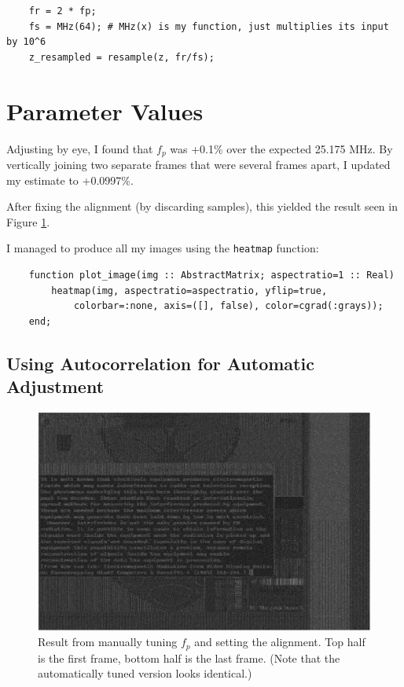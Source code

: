 \documentclass{article}
\newcommand*{\code}[1]{\texttt{#1}}
\begin{document}
\begin{verbatim}
    fr = 2 * fp;
    fs = MHz(64); # MHz(x) is my function, just multiplies its input by 10^6
    z_resampled = resample(z, fr/fs);
\end{verbatim}

\section*{Parameter Values}

Adjusting by eye, I found that $f_p$ was +0.1\% over the expected 25.175 MHz. By vertically joining two separate frames that were several frames apart, I updated my estimate to +0.0997\%.

After fixing the alignment (by discarding samples), this yielded the result seen in Figure \ref{fig:grayscale-image}.

I managed to produce all my images using the \code{heatmap} function:
\begin{verbatim}
    function plot_image(img :: AbstractMatrix; aspectratio=1 :: Real)
        heatmap(img, aspectratio=aspectratio, yflip=true,
            colorbar=:none, axis=([], false), color=cgrad(:grays));
    end;
\end{verbatim}

\subsection*{Using Autocorrelation for Automatic Adjustment}

\begin{figure}
    \centering
    \includegraphics[width=0.8\linewidth]{images/grayscale_manually_tuned_2_frames_joined.png}
    \caption{Result from manually tuning $f_p$ and setting the alignment. Top half is the first frame, bottom half is the last frame. (Note that the automatically tuned version looks identical.)}
    \label{fig:grayscale-image}
\end{figure}
\end{document}
